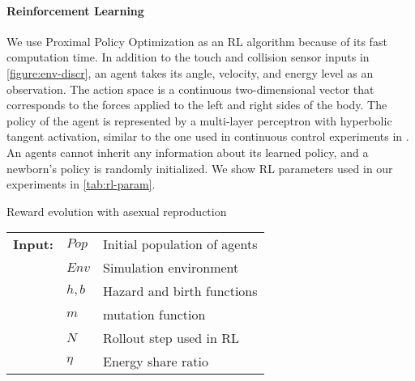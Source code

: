 \paragraph{Reinforcement Learning}
We use Proximal Policy Optimization \citep{schulmanProximalPolicyOptimization2017} as an RL algorithm because of its fast computation time. In addition to the touch and collision sensor inputs in \cref{figure:env-discr}, an agent takes its angle, velocity, and energy level as an observation. The action space is a continuous two-dimensional vector that corresponds to the forces applied to the left and right sides of the body. The policy of the agent is represented by a multi-layer perceptron with hyperbolic tangent activation, similar to the one used in continuous control experiments in \citep{schulmanProximalPolicyOptimization2017}. An agents cannot inherit any information about its learned policy, and a newborn's policy is randomly initialized. We show RL parameters used in our experiments in \cref{tab:rl-param}.

\begin{algorithm}[t]
  \caption{Reward evolution with asexual reproduction}\label{alg:reward-evo}
  \begin{tabular}{lll}
    \textbf{Input:} & $Pop$ & Initial population of agents \\
                    & $Env$ & Simulation environment \\
                    & $h, b$ & Hazard and birth functions \\
                    & $m$ & mutation function \\
                    & $N$ & Rollout step used in RL \\
                    & $\eta$ & Energy share ratio
  \end{tabular}
  \begin{algorithmic}[1]
    \Loop{}
      \EndOnce{}
    \EndFor{}
       
      \EndWith{}
       
      \EndWith{}
    \EndFor{}
  \EndLoop{}
\end{algorithmic}
\end{algorithm}


